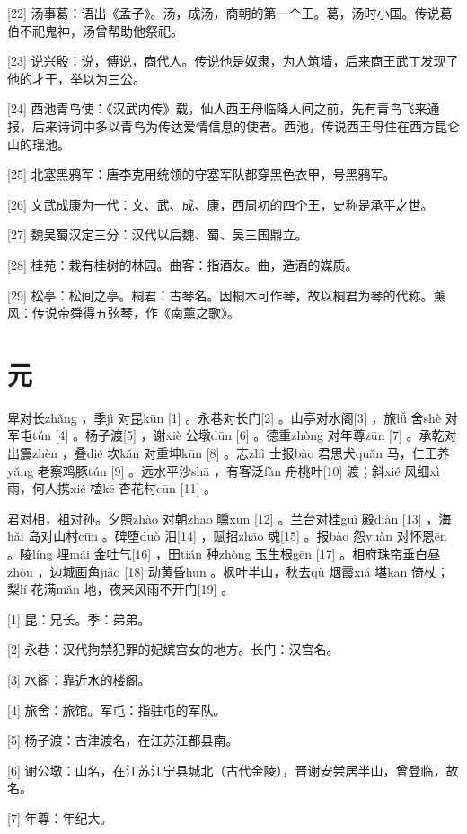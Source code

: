 \documentclass[12pt,UTF8]{ctexbook}
\begin{document}
[22] 汤事葛：语出《孟子》。汤，成汤，商朝的第一个王。葛，汤时小国。传说葛伯不祀鬼神，汤曾帮助他祭祀。

[23] 说兴殷：说，傅说，商代人。传说他是奴隶，为人筑墙，后来商王武丁发现了他的才干，举以为三公。

[24] 西池青鸟使：《汉武内传》载，仙人西王母临降人间之前，先有青鸟飞来通报，后来诗词中多以青鸟为传达爱情信息的使者。西池，传说西王母住在西方昆仑山的瑶池。

[25] 北塞黑鸦军：唐李克用统领的守塞军队都穿黑色衣甲，号黑鸦军。

[26] 文武成康为一代：文、武、成、康，西周初的四个王，史称是承平之世。

[27] 魏吴蜀汉定三分：汉代以后魏、蜀、吴三国鼎立。

[28] 桂苑：栽有桂树的林园。曲客：指酒友。曲，造酒的媒质。

[29] 松亭：松间之亭。桐君：古琴名。因桐木可作琴，故以桐君为琴的代称。薰风：传说帝舜得五弦琴，作《南薰之歌》。





\chapter{元}


卑对长zhǎng ，季jì 对昆kūn [1] 。永巷对长门[2] 。山亭对水阁[3] ，旅lǚ 舍shè 对军屯tún [4] 。杨子渡[5] ，谢xiè 公墩dūn [6] 。德重zhòng 对年尊zūn [7] 。承乾对出震zhèn ，叠dié 坎kǎn 对重坤kūn [8] 。志zhì 士报bào 君思犬quǎn 马，仁王养yǎng 老察鸡豚tún [9] 。远水平沙shā ，有客泛fàn 舟桃叶[10] 渡；斜xié 风细xì 雨，何人携xié 榼kē 杏花村cūn [11] 。

君对相，祖对孙。夕照zhào 对朝zhāo 曛xūn [12] 。兰台对桂guì 殿diàn [13] ，海hǎi 岛对山村cūn 。碑堕duò 泪[14] ，赋招zhāo 魂[15] 。报bào 怨yuàn 对怀恩ēn 。陵líng 埋mái 金吐气[16] ，田tián 种zhòng 玉生根gēn [17] 。相府珠帘垂白昼zhòu ，边城画角jiǎo [18] 动黄昏hūn 。枫叶半山，秋去qù 烟霞xiá 堪kān 倚杖；梨lí 花满mǎn 地，夜来风雨不开门[19] 。


[1] 昆：兄长。季：弟弟。

[2] 永巷：汉代拘禁犯罪的妃嫔宫女的地方。长门：汉宫名。

[3] 水阁：靠近水的楼阁。

[4] 旅舍：旅馆。军屯：指驻屯的军队。

[5] 杨子渡：古津渡名，在江苏江都县南。

[6] 谢公墩：山名，在江苏江宁县城北（古代金陵），晋谢安尝居半山，曾登临，故名。

[7] 年尊：年纪大。
\end{document}
